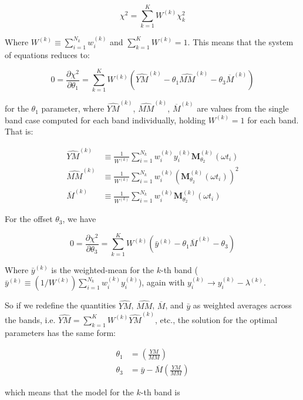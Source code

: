 \documentclass[apj]{emulateapj}
\newcommand{\MMhat}{\widehat{MM}}
\newcommand{\YMhat}{\widehat{YM}}
\newcommand{\Mbar}{\overline{M}}
\newcommand{\ybar}{\bar{y}}
\newcommand{\Mbk}[1][k]{\Mbar^{(#1)}}
\newcommand{\Mt}{\mathbf{M}}
\newcommand{\Mtshft}{\Mt_{\theta_2}}
\newcommand{\YMh}[1][k]{\YMhat^{(#1)}}
\newcommand{\MMh}[1][k]{\MMhat^{(#1)}}
\newcommand{\yb}[1][k]{\ybar^{(#1)}}
\newcommand{\wk}[1][k]{w^{(#1)}}
\newcommand{\yk}[1][k]{y^{(#1)}}
\newcommand{\Mtshftk}[1][k]{\Mtshft^{(#1)}}
\newcommand{\lk}[1][k]{\lambda^{(#1)}}
\newcommand{\Wtk}[1][k]{W^{(#1)}}
\begin{document}
\begin{appendix}
\begin{equation}
\chi^2 = \sum_{k=1}^K \Wtk\chi^2_k
\end{equation}

Where $\Wtk \equiv \sum_{i=1}^{N_k}\wk_i$ and $\sum_{k=1}^K\Wtk = 1$. This means that the system of equations reduces to:

\begin{equation}
0 = \frac{\partial\chi^2}{\partial\theta_1} = \sum_{k=1}^K \Wtk\left(\YMh - \theta_1\MMh - \theta_3\Mbk\right)
\end{equation}

for the $\theta_1$ parameter, where $\YMh$, $\MMh$, $\Mbk$ are values from the single band case computed for each band individually, holding $\Wtk = 1$ for each band. That is:

\begin{align}
\YMh &\equiv \frac{1}{\Wtk}\sum_{i=1}^{N_k}\wk_i \yk_i \Mtshftk(\omega t_i)\\
\MMh &\equiv \frac{1}{\Wtk}\sum_{i=1}^{N_k}\wk_i \left(\Mtshftk(\omega t_i)\right)^2\\
\Mbk &\equiv \frac{1}{\Wtk}\sum_{i=1}^{N_k}\wk_i \Mtshftk(\omega t_i)
\end{align}

For the offset $\theta_3$, we have

\begin{equation}
0 = \frac{\partial\chi^2}{\partial\theta_3} = \sum_{k=1}^K \Wtk\left(\yb - \theta_1\Mbk - \theta_3\right)
\end{equation}

Where $\yb$ is the weighted-mean for the $k$-th band ($\yb \equiv (1/\Wtk)\sum_{i=1}^{N_k}\wk_i\yk_i$), again with $\yk_i \rightarrow \yk_i - \lk$.

So if we redefine the quantities $\YMhat$, $\MMhat$, $\Mbar$, and $\bar{y}$ as weighted averages across the bands, i.e. $\YMhat = \sum_{k=1}^K \Wtk \YMh$, etc., the solution for the optimal parameters has the same form:

\begin{align}
\theta_1 &= \left(\frac{YM}{MM}\right)\\
\theta_3 &= \bar{y} - \Mbar\left(\frac{YM}{MM}\right)
\end{align}

which means that the model for the $k$-th band is


\end{appendix}
\end{document}
